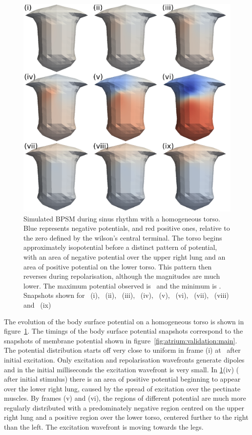 \begin{figure}
\includegraphics{figures/bsp/bsp_torso}
\caption[Body Surface Potential snapshots, homogeneous torso]{
\label{bsp:fig:homo_bsp}
Simulated BPSM during sinus rhythm with a homogeneous
torso.
Blue represents negative potentials, and red positive ones, relative to the zero
defined by the wilson's central terminal.
The torso begins approximately isopotential before a distinct pattern of
potential, with an area of negative potential over the upper right lung and an
area of positive potential on the lower torso.
This pattern then reverses during repolarisation, although the magnitudes are
much lower.
The maximum potential observed is \ and the minimum is .
Snapshots shown for \ (i), \ (ii), \ (iii), \ (iv),
\ (v), \ (vi), \ (vii), \ (viii) and \
(ix)
}
\end{figure}

The evolution of the body surface potential on a homogeneous torso is shown in
figure~\ref{bsp:fig:homo_bsp}.
The timings of the body surface potential snapshots correspond to the snapshots
of membrane potential shown in figure~\ref{fig:atrium:validation:main}.
The potential distribution starts off very close to uniform in frame (i) at
\ms{10}\ after initial excitation.
Only excitation and repolarisation wavefronts generate dipoles and in the
initial milliseconds the excitation wavefront is very small.
In \ref{bsp:fig:homo_bsp}(iv) ( after initial stimulus) there is an area
of positive potential beginning to appear over the lower right lung, caused by
the spread of excitation over the pectinate muscles.
By frames (v) and (vi), the regions of different potential are much more
regularly distributed with a predominately negative region centred on the upper
right lung and a positive region over the lower torso, centered further to the
right than the left.
The excitation wavefront is moving towards the legs.

